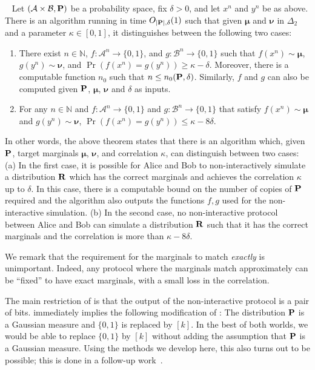 \documentclass{toc}
\newcommand{\bP}{{\bf P}}
\newcommand{\bR}{{\bf R}}
\begin{document}
\begin{theorem}~\label{thm:GKS}
    Let $(\mathcal{A} \times \mathcal{B}, \bP)$ be a probability space, fix $\delta > 0$,
    and let $x^n$ and $y^n$ be as above. 
There is an algorithm running in time $O_{| \bP|, \delta}(1)$ such that
given $\boldsymbol{\mu}$ and $\boldsymbol{\nu}$ in $\Delta_2$ and a parameter $\kappa \in [0,1]$, it distinguishes between the following two cases: 
\begin{enumerate}
  \item There exist $n \in \mathbb{N}$,
    $f: \mathcal{A}^n \rightarrow \{0, 1\}$, and
    $g: \mathcal{B}^n \rightarrow \{0, 1\}$ such that $f(x^n) \sim
    \boldsymbol{\mu}$, $g(y^n) \sim \boldsymbol{\nu}$, and $\Pr(f(x^n) =
    g(y^n)) \ge \kappa - \delta$. Moreover, 
    there is a computable function $n_0$ such that $ n \le n_0  
 ( \bP, \delta)$. Similarly, $f$ and $g$ can also be computed given $\bP$, $\boldsymbol{\mu}$, $\boldsymbol{\nu}$ and $\delta$ as inputs. 


  \item For any $n \in \mathbb{N}$ and $f: \mathcal{A}^n \rightarrow \{0, 1\}$
    and $g: \mathcal{B}^n \rightarrow \{0, 1\}$
    that satisfy $f(x^n) \sim
    \boldsymbol{\mu}$ and $g(y^n) \sim \boldsymbol{\nu}$, $\Pr(f(x^n) =
    g(y^n)) \le \kappa - 8\delta$.
\end{enumerate}
\end{theorem}
In other words, the above theorem states that there is an algorithm which, given $\bP$, target marginals $\boldsymbol{\mu}$, $\boldsymbol{\nu}$, and correlation $\kappa$, can distinguish between two cases: (a) In the first case, it is possible for Alice and Bob to non-interactively simulate a distribution $\bR$ which has the correct marginals and achieves the correlation $\kappa$ up to $\delta$. In this case, 
there is a computable bound on the number of copies of $\bP$ required and the algorithm also outputs the functions $f,g$ used for the non-interactive simulation. 
(b) In the second case, no non-interactive protocol between Alice and Bob can simulate a distribution $\bR$ such that it has the correct marginals and the correlation is more than $\kappa  - 8 \delta$.  

We remark that the requirement for the marginals to match \emph{exactly} is
unimportant. Indeed, any protocol where the marginals match approximately
can be ``fixed'' to have exact marginals, with a small loss in the correlation.

The main restriction of  is that the output of
the non-interactive protocol is a pair of bits. 
immediately implies the following modification of :
The distribution $\bP$ is a Gaussian measure and $\{0,1\}$ is replaced by $[k]$.
In the best of both worlds, we would be able to replace $\{0, 1\}$ by $[k]$
without adding the assumption that $\bP$ is a Gaussian measure.
Using the methods we develop here, this also turns out to be possible; this is done in a follow-up work~\cite{DMN:17b}. 
\end{document}
